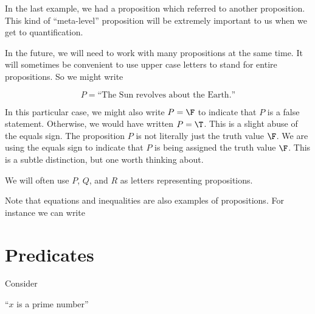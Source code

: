 In the last example, we had a proposition which referred to another proposition.  This kind of ``meta-level'' proposition will be extremely important to us when we get to quantification. 

In the future, we will need to work with many propositions at the same time.  It will sometimes be convenient to use upper case letters to stand for entire propositions.  So we might write

		\[P  =  \textrm{``The Sun revolves about the Earth.''} \]

In this particular case, we might also write $P = \F$ to indicate that $P$ is a false statement.  Otherwise, we would have written $P = \T$.  This is a slight abuse of the equals sign.  The proposition $P$ is not literally just the truth value $\F$.  We are using the equals sign to indicate that $P$ is being assigned the truth value $\F$.  This is a subtle distinction, but one worth thinking about.

We will often use $P$, $Q$, and $R$ as letters representing propositions.

Note that equations and inequalities are also examples of propositions. For instance we can write


\section{Predicates}

Consider

\begin{center}
``$x$ is a prime number''
\end{center}


